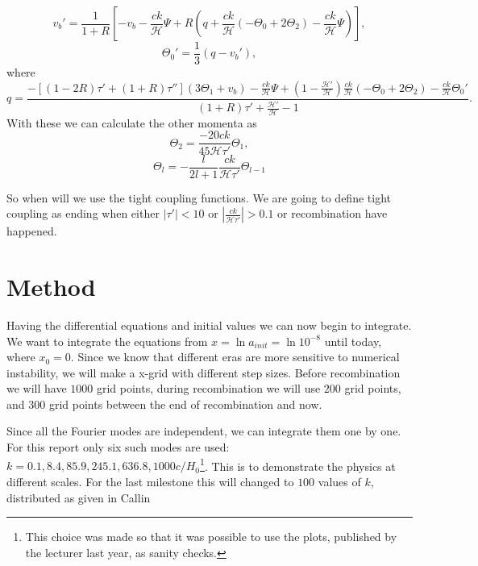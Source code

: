 \documentclass[a4paper,norsk, 10pt]{article}
\begin{document}
\begin{equation}
v_b' = \frac{1}{1+R}\left[-v_b - \frac{ck}{\mathcal{H}}\Psi + R(q + \frac{ck}{\mathcal{H}}(-\Theta_0 + 2\Theta_2) - \frac{ck}{\mathcal{H}}\Psi)\right],
\end{equation}
\begin{equation}
\Theta_0' = \frac{1}{3}(q - v_b'),
\end{equation}
where 
\begin{equation}
q = \frac{-[(1-2R)\tau' + (1+R)\tau''](3\Theta_1 + v_b) - \frac{ck}{\mathcal{H}}\Psi + (1-\frac{\mathcal{H}'}{\mathcal{H}})\frac{ck}{\mathcal{H}}(-\Theta_0 + 2\Theta_2) - \frac{ck}{\mathcal{H}}\Theta_0'}{(1+R)\tau' + \frac{\mathcal{H}'}{\mathcal{H}} - 1}.
\end{equation}
With these we can calculate the other momenta as
\begin{equation}
\Theta_2 = \frac{-20ck}{45\mathcal{H}\tau'}\Theta_1,
\end{equation}
\begin{equation}
\Theta_l = -\frac{l}{2l+1}\frac{ck}{\mathcal{H}\tau'}\Theta_{l-1}
\end{equation}

So when will we use the tight coupling functions. We are going to define tight coupling as ending when either $|\tau'| < 10$ or $\left|\frac{ck}{\mathcal{H}\tau'}\right|>0.1$ or recombination have happened.

\section{Method}
Having the differential equations and initial values we can now begin to integrate. We want to integrate the equations from $x = \ln a_{init} = \ln 10^{-8}$ until today, where $x_0 = 0$. Since we know that different eras are more sensitive to numerical instability, we will make a x-grid with different step sizes. Before recombination we will have $1000$ grid points, during recombination we will use $200$ grid points, and $300$ grid points between the end of recombination and now. 

Since all the Fourier modes are independent, we can integrate them one by one. For this report only six such modes are used: $k = 0.1, 8.4, 85.9, 245.1, 636.8, 1000 c/H_0$\footnote{This choice was made so that it was possible to use the plots, published by the lecturer last year, as sanity checks.}. This is to demonstrate the physics at different scales. For the last milestone this will changed to $100$ values of $k$, distributed as given in Callin 
\end{document}
